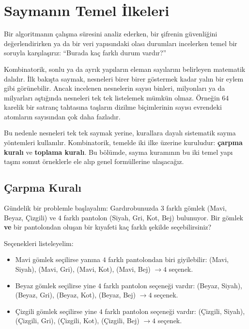 \chapter[Saymanın Temel İlkeleri · \textit{Temel}]{Saymanın Temel İlkeleri}

Bir algoritmanın çalışma süresini analiz ederken, bir şifrenin güvenliğini değerlendirirken ya da bir veri yapısındaki olası durumları incelerken temel bir soruyla karşılaşırız: ``Burada kaç farklı durum vardır?'' 

Kombinatorik, sonlu ya da ayrık yapıların eleman sayılarını belirleyen matematik dalıdır. İlk bakışta saymak, nesneleri birer birer göstermek kadar yalın bir eylem gibi görünebilir. Ancak incelenen nesnelerin sayısı binleri, milyonları ya da milyarları aştığında nesneleri tek tek listelemek mümkün olmaz. Örneğin $64$ karelik bir satranç tahtasına taşların dizilme biçimlerinin sayısı evrendeki atomların sayısından çok daha fazladır.

Bu nedenle nesneleri tek tek saymak yerine, kurallara dayalı sistematik sayma yöntemleri kullanılır. Kombinatorik, temelde iki ilke üzerine kuruludur: \textbf{çarpma kuralı} ve \textbf{toplama kuralı}. Bu bölümde, sayma kuramının bu iki temel yapı taşını somut örneklerle ele alıp genel formüllerine ulaşacağız.

\section{Çarpma Kuralı}

Gündelik bir problemle başlayalım: Gardırobunuzda $3$ farklı gömlek (Mavi, Beyaz, Çizgili) ve $4$ farklı pantolon (Siyah, Gri, Kot, Bej) bulunuyor. Bir gömlek \textbf{ve} bir pantolondan oluşan bir kıyafeti kaç farklı şekilde seçebilirsiniz?

Seçenekleri listeleyelim:
\begin{itemize}
  \item Mavi gömlek seçilirse yanına $4$ farklı pantolondan biri giyilebilir: (Mavi, Siyah), (Mavi, Gri), (Mavi, Kot), (Mavi, Bej) $\to 4$ seçenek.
  \item Beyaz gömlek seçilirse yine $4$ farklı pantolon seçeneği vardır: (Beyaz, Siyah), (Beyaz, Gri), (Beyaz, Kot), (Beyaz, Bej) $\to 4$ seçenek.
  \item Çizgili gömlek seçilirse yine $4$ farklı pantolon seçeneği vardır: (Çizgili, Siyah), (Çizgili, Gri), (Çizgili, Kot), (Çizgili, Bej) $\to 4$ seçenek.
\end{itemize}


